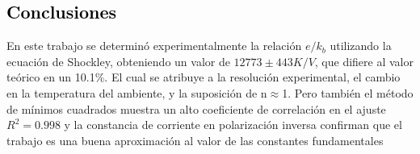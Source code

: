 \textcolor{black}{\section{Conclusiones}}
En este trabajo se determinó experimentalmente la relación $e/k_b$ utilizando la ecuación de Shockley, obteniendo un valor de $12773\pm  443K/V$, que difiere al valor teórico en un 10.1\%. El cual se atribuye a la resolución experimental, el cambio en la temperatura del ambiente, y la suposición de n$\approx$1. Pero también el método de mínimos cuadrados muestra un alto coeficiente de correlación en el ajuste $R^{2}=0.998$ y la constancia de corriente en polarización inversa confirman que el trabajo es una buena aproximación al valor de las constantes fundamentales 